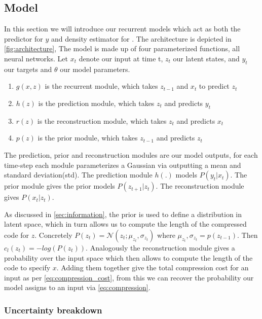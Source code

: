 \documentclass[../main.tex]{subfiles}
\begin{document}
\subsection{Model}

In this section we will introduce our recurrent models which act as both the predictor for $y$ and density estimator for . 
The architecture is depicted in \cref{fig:architecture}, The model is made up of four parameterized functions, all neural networks. Let $x_t$ denote our input at time t, $z_t$ our latent states, and $y_t$ our targets and $\theta$ our model parameters.
\begin{enumerate}
    \item $g(x, z)$ is the recurrent module, which takes $z_{t-1}$ and $x_t$ to predict $z_t$
    \item $h(z)$ is the prediction module, which takes $z_t$ and predicts $y_t$
    \item $r(z)$ is the reconstruction module, which takes $z_t$ and predicts $x_t$
    \item $p(z)$ is the prior module, which takes $z_{t-1}$ and predicts $z_t$
\end{enumerate}

The prediction, prior and reconstruction modules are our model outputs, for each time-step each module parameterizes a Gaussian via outputting a mean and standard deviation(std). 
The prediction module $h(.)$ models $P(y_t|x_t)$. The prior module gives the prior models $P(z_{t+1}| z_t)$. The reconstruction module gives $P(x_t|z_t)$. 

As discussed in \cref{sec:information}, the prior is used to define a distribution in latent space, which in turn allows us to compute the length of the compressed code for $z$. Concretely $P(z_t) = \mathcal{N}(z_t; \mu_{z_t}, \sigma_{z_t})$ where $\mu_{z_t}, \sigma_{z_t} = p(z_{t-1})$. Then $c_l(z_t) = -log(P(z_t))$. 
Analogously the reconstruction module gives a probability over the input space which then allows to compute the length of the code to specify $x$. Adding them together give the total compression cost for an input as per \cref{eq:compression_cost}, from this we can recover the probability our model assigns to an input via \cref{eq:compression}.

\subsubsection{Uncertainty breakdown}
\end{document}
